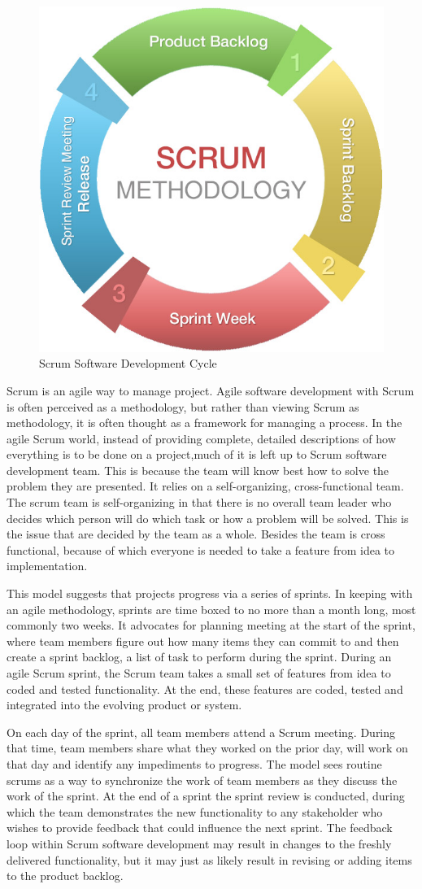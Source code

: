 \begin{figure}[!ht]
\centering
\includegraphics[width = 5 cm]{fig/scrum-chart.jpg}
\caption{Scrum Software Development Cycle}
\label{fig:scrum}
\end{figure}
Scrum is an agile way to manage project. Agile software development with Scrum is often perceived as a methodology, but rather than viewing Scrum as methodology, it is often thought as a framework for managing a process. In the agile Scrum world, instead of providing complete, detailed descriptions of how everything is to be done on a project,much of it is left up to Scrum software development team. This is because the team will know best how to solve the problem they are presented. It relies on a self-organizing, cross-functional team. The scrum team is self-organizing in that there is no overall team leader who decides which person will do which task or how a problem will be solved. This is the issue that are decided by the team as a whole. Besides the team is cross functional, because of which everyone is needed to take a feature from idea to implementation.

This model suggests that projects progress via a series of sprints. In keeping with an agile methodology, sprints are time boxed to no more than a month long, most commonly two weeks. It advocates for planning meeting at the start of the sprint, where team members figure out how many items they can commit to and then create a sprint backlog, a list of task to perform during the sprint. During an agile Scrum sprint, the Scrum team takes a small set of features from idea to coded and tested functionality. At the end, these features are coded, tested and integrated into the evolving product or system.

On each day of the sprint, all team members attend a Scrum meeting. During that time, team members share what they worked on the prior day, will work on that day and identify any impediments to progress. The model sees routine scrums as a way to synchronize the work of team members as they discuss the work of the sprint. At the end of a sprint the sprint review is conducted, during which the team demonstrates the new functionality to any stakeholder who wishes to provide feedback that could influence the next sprint. The feedback loop within Scrum software development may result in changes to the freshly delivered functionality, but it may just as likely result in revising or adding items to the product backlog.

